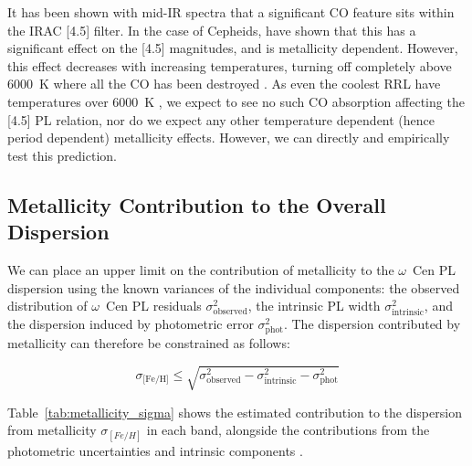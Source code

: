 \documentclass[a4paper,fleqn,usenatbib]{mnras}
\newcommand{\ocen}{$\omega$~Cen\xspace}
\begin{document}
It has been shown with mid-IR spectra that a significant CO feature sits within the IRAC [4.5] filter. In the case of Cepheids, \citet{2016MNRAS.459.1170S} have shown that this has a significant effect on the [4.5] magnitudes, and is metallicity dependent. However, this effect decreases with increasing temperatures, turning off completely above 6000~K where all the CO has been destroyed \citep{2016MNRAS.459.1170S}. As even the coolest RRL have temperatures over 6000~K \citep{1971PASP...83..697I}, we expect to see no such CO absorption affecting the [4.5] PL relation, nor do we expect any other temperature dependent (hence period dependent) metallicity effects. However, we can directly and empirically test this prediction. %

\subsection{Metallicity Contribution to the Overall Dispersion}
\label{sec:dispersions}

We can place an upper limit on the contribution of metallicity to the \ocen PL dispersion using the known variances of the individual components: the observed distribution of \ocen PL residuals $\sigma_{\text{observed}}^2$, the intrinsic PL width $\sigma_{\text{intrinsic}}^2$, and the dispersion induced by photometric error $\sigma_{\text{phot}}^2$. The dispersion contributed by metallicity can therefore be constrained as follows:

\begin{equation}
\sigma_\text{[Fe/H]} \leq \sqrt{\sigma_{\text{observed}}^2 - \sigma_{\text{intrinsic}}^2 - \sigma_{\text{phot}}^2}
\end{equation}


Table~\ref{tab:metallicity_sigma} shows the estimated contribution to the dispersion from metallicity $\sigma_{[Fe/H]}$ in each band, alongside the contributions from the photometric uncertainties and intrinsic components \citep[from][for the near-- and mid--IR, respectively]{2015ApJ...808...50M, 2015ApJ...808...11N}. %
\end{document}
